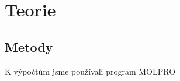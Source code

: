 
\chapter{Teorie}
\section{}
\section{Metody}
K výpočtům jsme používali program MOLPRO\cite{MOLPRO-WIREs}\cite{MOLPRO}